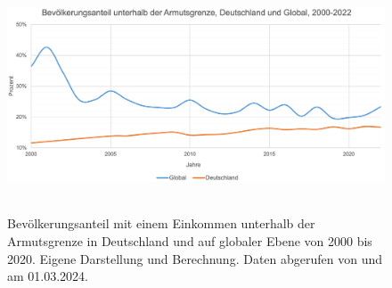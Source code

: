 \begin{figure}[H]
    \centering
    \includegraphics[height=6.9cm]{Bilder/Armutsgrenze2.png}
    \caption[Bevölkerungsanteil unterhalb der Armutsgrenze, Deutschland und global, 2000-2020]{Bevölkerungsanteil mit einem Einkommen unterhalb der Armutsgrenze in Deutschland und auf globaler Ebene von 2000 bis 2020. Eigene Darstellung und Berechnung. Daten abgerufen von \cite[][(global)]{wb_armutsquote_global_2022} und \cite[][(Deutschland)]{bmas_arb_armutsrisikoquote_2023} am 01.03.2024.}
    \label{fig:iso_norm}
\end{figure}

